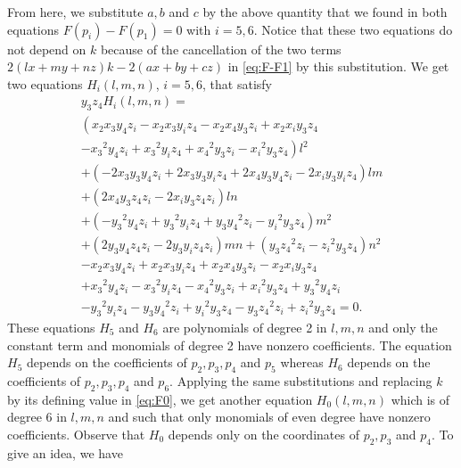 \documentclass[5p]{elsarticle}
\newcommand{\com}[1]{{\color{black} #1}}
\begin{document}
From here, we substitute $a,b$ and $c$ by the above quantity that we found in both equations $F(p_i)-F(p_1)=0$ with $i=5,6$. \com{Notice} that these two equations do not depend on $k$ because of the cancellation of the two terms $ 2\left( lx+my+nz \right) k -2(ax+by+cz)$ in \eqref{eq:F-F1} by this substitution. We get two equations $H_i(l,m,n)$, $i=5,6$, that satisfy
\begin{multline*}
y_3z_4H_i(l,m,n)= \\
	 \left( { x_2} { x_3} { y_4} { z_i}-{ x_2} { x_3} {
	 y_i} { z_4}-{ x_2} { x_4} { y_3} { z_i}+{ x_2} {
	 x_i} { y_3} { z_4} \right. \\ \left. -{{ x_3}}^{2}{ y_4} { z_i}+{{ x_3}
	}^{2}{ y_i} { z_4}+{{ x_4}}^{2}{ y_3} { z_i}-{{ x_i}}^{2
	}{ y_3} { z_4} \right) {l}^{2} \\
	+ \left( -2 { x_3} { y_3} {
	 y_4} { z_i}+2 { x_3} { y_3} { y_i} { z_4}+2 { x_4
	} { y_3} { y_4} { z_i}-2 { x_i} { y_3} { y_i} { 
	z_4} \right) lm \\
	+ \left( 2 { x_4} { y_3} { z_4} { z_i}-2 {
	 x_i} { y_3} { z_4} { z_i} \right) ln \\
	 + \left( -{{ y_3}}^{
	2}{ y_4} { z_i}+{{ y_3}}^{2}{ y_i} { z_4}+{ y_3} {{ 
	y_4}}^{2}{ z_i}-{{ y_i}}^{2}{ y_3} { z_4} \right) {m}^{2} \\
	+
	 \left( 2 { y_3} { y_4} { z_4} { z_i}-2 { y_3} { y_i
	} { z_4} { z_i} \right) mn 
	+ \left( { y_3} {{ z_4}}^{2}{ 
	z_i}-{{ z_i}}^{2}{ y_3} { z_4} \right) {n}^{2}\\ 
	-{ x_2} { x_3
	} { y_4} { z_i}+{ x_2} { x_3} { y_i} { z_4}+{ x_2}
	 { x_4} { y_3} { z_i}-{ x_2} { x_i} { y_3} { z_4} \\ +
	{{ x_3}}^{2}{ y_4} { z_i}-{{ x_3}}^{2}{ y_i} { z_4}-{{
	 x_4}}^{2}{ y_3} { z_i}+{{ x_i}}^{2}{ y_3} { z_4}+{{ 
	y_3}}^{2}{ y_4} { z_i}\\
	-{{ y_3}}^{2}{ y_i} { z_4}-{ y_3} 
	{{ y_4}}^{2}{ z_i}+{{ y_i}}^{2}{ y_3} { z_4}-{ y_3} {{
	 z_4}}^{2}{ z_i}+{{ z_i}}^{2}{ y_3} { z_4}=0.
\end{multline*}
These equations $H_5$ and $H_6$ are polynomials of degree 2 in $l,m,n$ and only the constant term and monomials of degree 2 have nonzero coefficients. The equation $H_5$ depends on the coefficients of $p_2,p_3,p_4$ and $p_5$ whereas $H_6$ depends on the coefficients of $p_2,p_3,p_4$ and $p_6$.   \com{Applying} the same substitutions and replacing $k$ by its defining value in \eqref{eq:F0}, we get another equation $H_0(l,m,n)$ which is of degree 6 in $l,m,n$ and such that only monomials of even degree have nonzero coefficients. Observe that $H_0$ \com{depends only on} the coordinates of $p_2,p_3$ and $p_4$. To give an idea, we have
\end{document}
